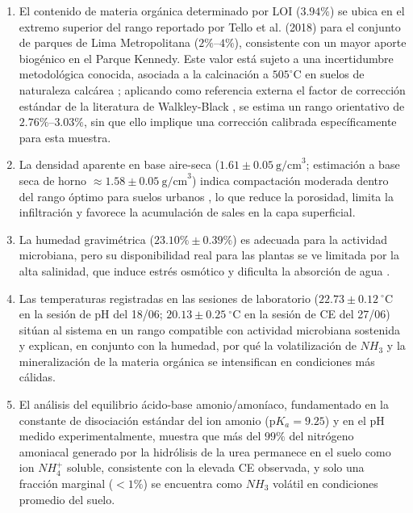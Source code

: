 \documentclass[fleqn]{jaes}
\begin{document}
\begin{enumerate}
  \item El contenido de materia orgánica determinado por LOI ($3.94\%$) se ubica en el extremo superior del rango reportado por Tello et al. (2018) para el conjunto de parques de Lima Metropolitana ($2\%$--$4\%$), consistente con un mayor aporte biogénico en el Parque Kennedy. Este valor está sujeto a una incertidumbre metodológica conocida, asociada a la calcinación a $505^\circ\text{C}$ en suelos de naturaleza calcárea \cite{Hoogsteen2015}; aplicando como referencia externa el factor de corrección estándar de la literatura de Walkley-Black \cite{NelsonSommers1982}, se estima un rango orientativo de $2.76\%$--$3.03\%$, sin que ello implique una corrección calibrada específicamente para esta muestra.

  \item La densidad aparente en base aire-seca ($1.61 \pm 0.05~\text{g/cm}^3$; estimación a base seca de horno $\approx 1.58 \pm 0.05~\text{g/cm}^3$) indica compactación moderada dentro del rango óptimo para suelos urbanos \cite{Patterson1977}, lo que reduce la porosidad, limita la infiltración y favorece la acumulación de sales en la capa superficial.

  \item La humedad gravimétrica ($23.10\% \pm 0.39\%$) es adecuada para la actividad microbiana, pero su disponibilidad real para las plantas se ve limitada por la alta salinidad, que induce estrés osmótico y dificulta la absorción de agua \cite{Rath2015}.

  \item Las temperaturas registradas en las sesiones de laboratorio ($22.73 \pm 0.12~^\circ\text{C}$ en la sesión de pH del 18/06; $20.13 \pm 0.25~^\circ\text{C}$ en la sesión de CE del 27/06) sitúan al sistema en un rango compatible con actividad microbiana sostenida y explican, en conjunto con la humedad, por qué la volatilización de $NH_3$ y la mineralización de la materia orgánica se intensifican en condiciones más cálidas.

  \item El análisis del equilibrio ácido-base amonio/amoníaco, fundamentado en la constante de disociación estándar del ion amonio ($\text{p}K_a=9.25$) y en el pH medido experimentalmente, muestra que más del $99\%$ del nitrógeno amoniacal generado por la hidrólisis de la urea permanece en el suelo como ion $NH_4^+$ soluble, consistente con la elevada CE observada, y solo una fracción marginal ($<1\%$) se encuentra como $NH_3$ volátil en condiciones promedio del suelo.


\end{enumerate}
\end{document}
